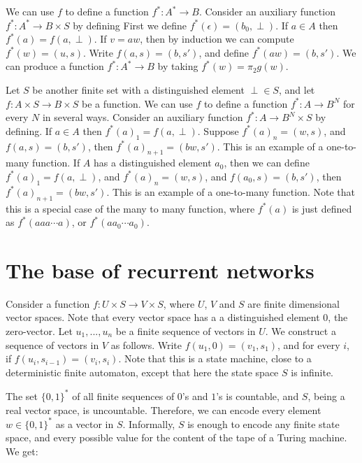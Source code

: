 \documentclass[10pt]{amsart}
\theoremstyle{definition}
\begin{document}
We can use $f$ to define a function $f^*:A^*\to B$. Consider an auxiliary function $f^*:A^*\to B\times S$ by defining First we define $f^*(\epsilon)=(b_0, \perp)$. If $a\in A$ then $f^*(a)=f(a, \perp)$. If $v=aw$, then by induction we can compute $f^*(w)=(u, s)$. Write $f(a, s)=(b, s')$, and define $f^*(aw)=(b, s')$.  We can produce a function $f^*:A^*\to B$ by taking $f^*(w)=\pi_2 g(w)$.

Let $S$ be another finite set with a distinguished element $\perp\in S$, and let $f:A\times S\to B\times S$ be a function. We can use $f$ to define a function $f^*:A\to B^N$ for every $N$ in several ways. Consider an auxiliary function $f^*:A\to B^N\times S$ by defining. If $a\in A$ then $f^*(a)_1=f(a, \perp)$. Suppose $f^*(a)_n=(w, s)$, and  $f(a, s) = (b, s')$, then $f^*(a)_{n+1}=(bw, s')$.  This is an example of a one-to-many function. If $A$ has a distinguished element $a_0$, then we can define $f^*(a)_1=f(a, \perp)$, and $f^*(a)_n=(w, s)$, and  $f(a_0, s) = (b, s')$, then $f^*(a)_{n+1}=(bw, s')$.  This is an example of a one-to-many function.  Note that this is a special case of the many to many function, where $f^*(a)$ is just defined as $f^*(aaa\cdots a)$, or $f^*(aa_0\cdots a_0)$.


%
%




\section{The base of recurrent networks}

Consider a function $f:U\times S\to V\times S$, where $U$, $V$ and $S$ are finite dimensional vector spaces.
Note that every vector space has a a distinguished element $0$, the zero-vector.  Let $u_1,...,u_n$ be a finite
sequence of vectors in $U$.  We construct a sequence of vectors in $V$ as follows. Write $f(u_1, 0)=(v_1, s_1)$,
and for every $i$, if $f(u_{i}, s_{i-1})=(v_i, s_i)$. Note that this is a state machine, close to a
deterministic finite automaton, except that here the state space $S$ is infinite.

The set $\{0,1\}^*$ of all finite sequences of $0$'s and $1$'s is countable, and $S$, being a real vector space,
is uncountable.  Therefore, we can encode every element $w\in\{0,1\}^*$ as a vector in $S$.  Informally,
$S$ is enough to encode any finite state space, and every possible value for the content of the tape of a
Turing machine. We get:
\end{document}
